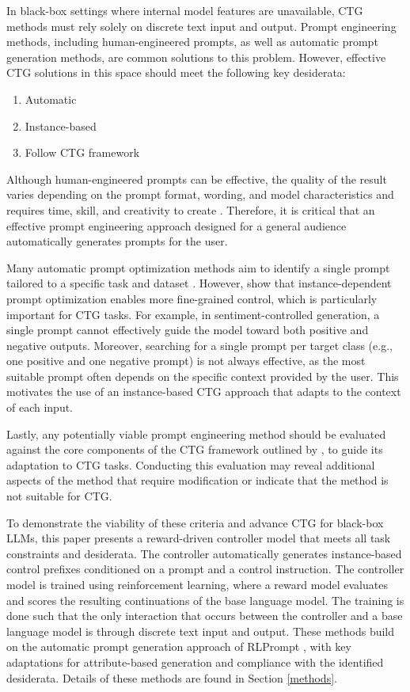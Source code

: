 \documentclass[phd,electronic,oneside,twosidetoc,letterpaper,chaptercenter,parttop,lof]{byumsphd}
\begin{document}
In black-box settings where internal model features are unavailable, CTG methods must rely solely on discrete text input and output.
Prompt engineering methods, including human-engineered prompts, as well as automatic prompt generation methods, are common solutions to this problem.
However, effective CTG solutions in this space should meet the following key desiderata:

\begin{enumerate}
    \item Automatic
    \item Instance-based 
    \item Follow CTG framework
\end{enumerate}

Although human-engineered prompts can be effective, the quality of the result varies depending on the prompt format, wording, and model characteristics \citep{meincke2025prompting} and requires time, skill, and creativity to create \citep{lazovsky2025prompt}.
Therefore, it is critical that an effective prompt engineering approach designed for a general audience automatically generates prompts for the user.

Many automatic prompt optimization methods aim to identify a single prompt tailored to a specific task and dataset \citep{shin2020autoprompt, yang2024opro}.
However, \citet{wu2022idpg} show that instance-dependent prompt optimization enables more fine-grained control, which is particularly important for CTG tasks.
For example, in sentiment-controlled generation, a single prompt cannot effectively guide the model toward both positive and negative outputs.
Moreover, searching for a single prompt per target class (e.g., one positive and one negative prompt) is not always effective, as the most suitable prompt often depends on the specific context provided by the user.
This motivates the use of an instance-based CTG approach that adapts to the context of each input.

Lastly, any potentially viable prompt engineering method should be evaluated against the core components of the CTG framework outlined by \citet{zhang2023survey}, to guide its adaptation to CTG tasks.
Conducting this evaluation may reveal additional aspects of the method that require modification or indicate that the method is not suitable for CTG.

To demonstrate the viability of these criteria and advance CTG for black-box LLMs, this paper presents a reward-driven controller model that meets all task constraints and desiderata.
The controller automatically generates instance-based control prefixes conditioned on a prompt and a control instruction.
The controller model is trained using reinforcement learning, where a reward model evaluates and scores the resulting continuations of the base language model.
The training is done such that the only interaction that occurs between the controller and a base language model is through discrete text input and output.
These methods build on the automatic prompt generation approach of RLPrompt \citep{deng-etal-2022-rlprompt}, with key adaptations for attribute-based generation and compliance with the identified desiderata.
Details of these methods are found in Section \ref{methods}.
\end{document}

